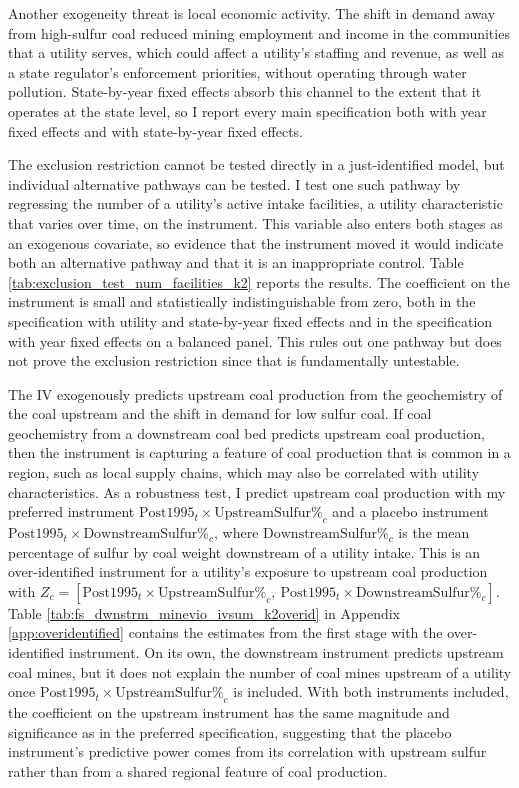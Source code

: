 \documentclass[12pt]{article}
\begin{document}
Another exogeneity threat is local economic activity. The shift in demand away from high-sulfur coal reduced mining employment and income in the communities that a utility serves, which could affect a utility's staffing and revenue, as well as a state regulator's enforcement priorities, without operating through water pollution. State-by-year fixed effects absorb this channel to the extent that it operates at the state level, so I report every main specification both with year fixed effects and with state-by-year fixed effects.

The exclusion restriction cannot be tested directly in a just-identified model, but individual alternative pathways can be tested. I test one such pathway by regressing the number of a utility's active intake facilities, a utility characteristic that varies over time, on the instrument. This variable also enters both stages as an exogenous covariate, so evidence that the instrument moved it would indicate both an alternative pathway and that it is an inappropriate control. Table \ref{tab:exclusion_test_num_facilities_k2} reports the results. The coefficient on the instrument is small and statistically indistinguishable from zero, both in the specification with utility and state-by-year fixed effects and in the specification with year fixed effects on a balanced panel. This rules out one pathway but does not prove the exclusion restriction since that is fundamentally untestable.

The IV exogenously predicts upstream coal production from the geochemistry of the coal upstream and the shift in demand for low sulfur coal. If coal geochemistry from a downstream coal bed predicts upstream coal production, then the instrument is capturing a feature of coal production that is common in a region, such as local supply chains, which may also be correlated with utility characteristics. As a robustness test, I predict upstream coal production with my preferred instrument $\text{Post1995}_t \times \text{UpstreamSulfur\%}_c$ and a placebo instrument $\text{Post1995}_t \times \text{DownstreamSulfur\%}_c$, where $\text{DownstreamSulfur\%}_c$ is the mean percentage of sulfur by coal weight downstream of a utility intake. This is an over-identified instrument for a utility's exposure to upstream coal production with $Z_c = [\text{Post1995}_t \times \text{UpstreamSulfur\%}_c,\ \text{Post1995}_t \times \text{DownstreamSulfur\%}_c]$. Table \ref{tab:fs_dwnstrm_minevio_ivsum_k2overid} in Appendix \ref{app:overidentified} contains the estimates from the first stage with the over-identified instrument. On its own, the downstream instrument predicts upstream coal mines, but it does not explain the number of coal mines upstream of a utility once $\text{Post1995}_t \times \text{UpstreamSulfur\%}_c$ is included. With both instruments included, the coefficient on the upstream instrument has the same magnitude and significance as in the preferred specification, suggesting that the placebo instrument's predictive power comes from its correlation with upstream sulfur rather than from a shared regional feature of coal production.
\end{document}
